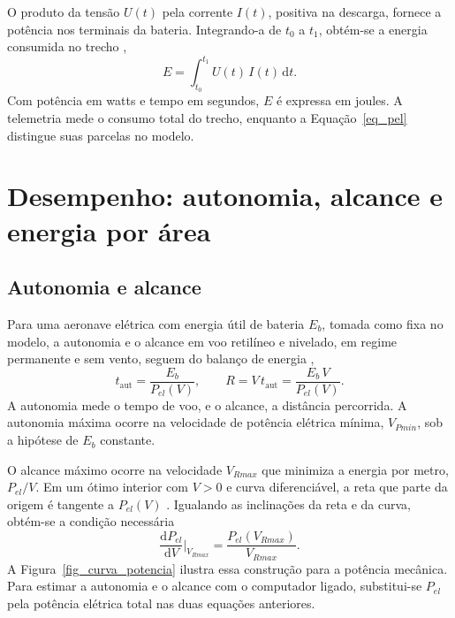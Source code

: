 O produto da tensão $U(t)$ pela corrente $I(t)$, positiva na descarga, fornece a potência nos terminais da bateria. Integrando-a de $t_0$ a $t_1$, obtém-se a energia consumida no trecho \cite[Eq.~(3), p.~58385]{abeywickrama2018energy},
\begin{equation}
  E = \int_{t_0}^{t_1} U(t)\,I(t)\,\mathrm{d}t.
  \label{eq_energia}
\end{equation}
Com potência em watts e tempo em segundos, $E$ é expressa em joules. A telemetria mede o consumo total do trecho, enquanto a Equação~\eqref{eq_pel} distingue suas parcelas no modelo.

\section{Desempenho: autonomia, alcance e energia por área}
\label{sec_desempenho}

\subsection{Autonomia e alcance}

Para uma aeronave elétrica com energia útil de bateria $E_b$, tomada como fixa no modelo, a autonomia e o alcance em voo retilíneo e nivelado, em regime permanente e sem vento, seguem do balanço de energia \cite{zeng2019energia},
\begin{equation}
  t_{\mathrm{aut}} = \frac{E_b}{P_{el}(V)}, \qquad
  R = V\,t_{\mathrm{aut}} = \frac{E_b\,V}{P_{el}(V)}.
  \label{eq_aut}
\end{equation}
A autonomia mede o tempo de voo, e o alcance, a distância percorrida. A autonomia máxima ocorre na velocidade de potência elétrica mínima, $V_{Pmin}$, sob a hipótese de $E_b$ constante.

O alcance máximo ocorre na velocidade $V_{Rmax}$ que minimiza a energia por metro, $P_{el}/V$. Em um ótimo interior com $V>0$ e curva diferenciável, a reta que parte da origem é tangente a $P_{el}(V)$ \cite[p.~106]{saarlas2006}. Igualando as inclinações da reta e da curva, obtém-se a condição necessária
\begin{equation}
  \frac{\mathrm{d}P_{el}}{\mathrm{d}V}\bigg|_{V_{Rmax}} = \frac{P_{el}(V_{Rmax})}{V_{Rmax}}.
  \label{eq_vrmax}
\end{equation}
A Figura~\ref{fig_curva_potencia} ilustra essa construção para a potência mecânica. Para estimar a autonomia e o alcance com o computador ligado, substitui-se $P_{el}$ pela potência elétrica total nas duas equações anteriores.

